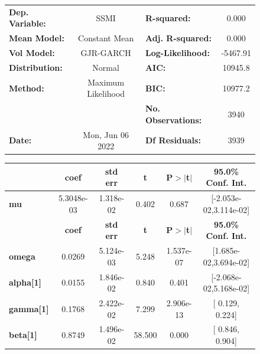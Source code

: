 \documentclass[a4paper, oneside]{discothesis}
\begin{document}
\begin{figure}
\begin{multicols}{2}
{\begin{center}
\begin{tabular}{lclc}
\toprule
\textbf{Dep. Variable:} &        SSMI        & \textbf{  R-squared:         } &     0.000   \\
\textbf{Mean Model:}    &   Constant Mean    & \textbf{  Adj. R-squared:    } &     0.000   \\
\textbf{Vol Model:}     &     GJR-GARCH      & \textbf{  Log-Likelihood:    } &   -5467.91  \\
\textbf{Distribution:}  &       Normal       & \textbf{  AIC:               } &    10945.8  \\
\textbf{Method:}        & Maximum Likelihood & \textbf{  BIC:               } &    10977.2  \\
\textbf{}               &                    & \textbf{  No. Observations:  } &    3940     \\
\textbf{Date:}          &  Mon, Jun 06 2022  & \textbf{  Df Residuals:      } &    3939     \\
\bottomrule
\end{tabular}
\begin{tabular}{lccccc}
            & \textbf{coef} & \textbf{std err} & \textbf{t} & \textbf{P$> |$t$|$} & \textbf{95.0\% Conf. Int.}  \\
\midrule
\textbf{mu} &   5.3048e-03  &    1.318e-02     &     0.402  &          0.687       &   [-2.053e-02,3.114e-02]    \\
                  & \textbf{coef} & \textbf{std err} & \textbf{t} & \textbf{P$> |$t$|$} & \textbf{95.0\% Conf. Int.}  \\
\midrule
\textbf{omega}    &       0.0269  &    5.124e-03     &     5.248  &      1.537e-07       &   [1.685e-02,3.694e-02]     \\
\textbf{alpha[1]} &       0.0155  &    1.846e-02     &     0.840  &          0.401       &   [-2.068e-02,5.168e-02]    \\
\textbf{gamma[1]} &       0.1768  &    2.422e-02     &     7.299  &      2.906e-13       &     [  0.129,  0.224]       \\
\textbf{beta[1]}  &       0.8749  &    1.496e-02     &    58.500  &        0.000         &     [  0.846,  0.904]       \\
\bottomrule
\end{tabular}
\end{center}

}
\end{multicols}
\end{figure}
\end{document}
